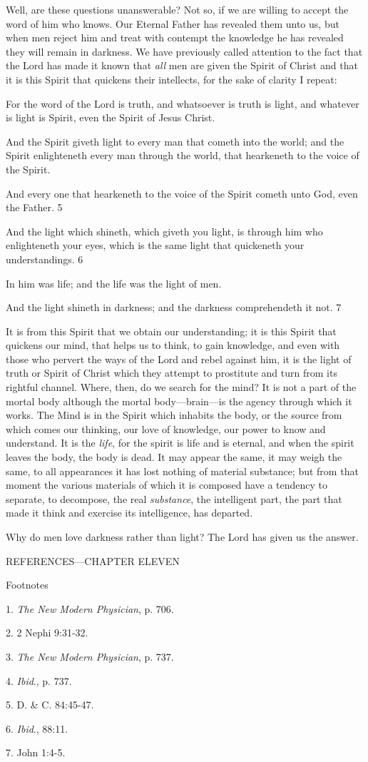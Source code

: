Well, are these questions unanswerable? Not so, if we are willing to accept the word of him
who knows. Our Eternal Father has revealed them unto us, but when men reject him and treat
with contempt the knowledge he has revealed they will remain in darkness. We have
previously called attention to the fact that the Lord has made it known that \textit{all} men are given
the Spirit of Christ and that it is this Spirit that quickens their intellects, for the sake of clarity
I repeat:

For the word of the Lord is truth, and whatsoever is truth is light, and whatever is light is
Spirit, even the Spirit of Jesus Christ.

And the Spirit giveth light to every man that cometh into the world; and the Spirit
enlighteneth every man through the world, that hearkeneth to the voice of the Spirit.

And every one that hearkeneth to the voice of the Spirit cometh unto God, even the Father. 5

And the light which shineth, which giveth you light, is through him who enlighteneth your
eyes, which is the same light that quickeneth your understandings. 6

In him was life; and the life was the light of men.

And the light shineth in darkness; and the darkness comprehendeth it not. 7

It is from this Spirit that we obtain our understanding; it is this Spirit that quickens our mind,
that helps us to think, to gain knowledge, and even with those who pervert the ways of the
Lord and rebel against him, it is the light of truth or Spirit of Christ which they attempt to
prostitute and turn from its rightful channel. Where, then, do we search for the mind? It is not
a part of the mortal body although the mortal body—brain—is the agency through which it
works. The Mind is in the Spirit which inhabits the body, or the source from which comes
our thinking, our love of knowledge, our power to know and understand. It is the \textit{life}, for the
spirit is life and is eternal, and when the spirit leaves the body, the body is dead. It may
appear the same, it may weigh the same, to all appearances it has lost nothing of material
substance; but from that moment the various materials of which it is composed have a
tendency to separate, to decompose, the real \textit{substance}, the intelligent part, the part that made
it think and exercise its intelligence, has departed.

Why do men love darkness rather than light? The Lord has given us the answer.

\newpage
REFERENCES—CHAPTER ELEVEN

Footnotes

1. \textit{The New Modern Physician}, p. 706.

2. 2 Nephi 9:31-32.

3. \textit{The New Modern Physician}, p. 737.

4. \textit{Ibid}., p. 737.

5. D. \& C. 84:45-47.

6. \textit{Ibid}., 88:11.

7. John 1:4-5.

